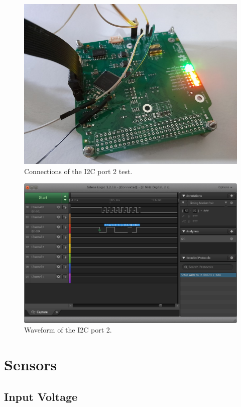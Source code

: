 \begin{figure}[!ht]
    \begin{center}
        \includegraphics[width=0.7\columnwidth]{figures/v05/test-i2c-2.jpg}
        \caption{Connections of the I2C port 2 test.}
        \label{fig:test-i2c-2}
    \end{center}
\end{figure}

\begin{figure}[!ht]
    \begin{center}
        \includegraphics[width=\columnwidth]{figures/v05/waveform-i2c-2.png}
        \caption{Waveform of the I2C port 2.}
        \label{fig:waveform-i2c-2}
    \end{center}
\end{figure}

\section{Sensors}

\subsection{Input Voltage}

